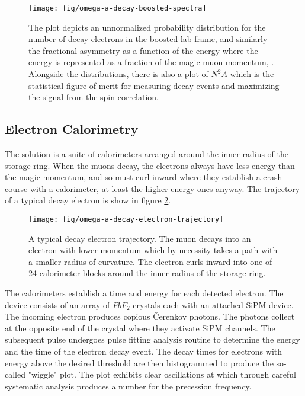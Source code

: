 \begin{figure}
\label{fig:omega-a-decay-boosted-spectra}
\texttt{[image: fig/omega-a-decay-boosted-spectra]}
\caption{The plot depicts an unnormalized probability distribution for the number of decay electrons in the boosted lab frame, and similarly the fractional asymmetry as a function of the energy where the energy is represented as a fraction of the magic muon momentum, \pmagic. Alongside the distributions, there is also a plot of $N^2A$ which is the statistical figure of merit for measuring decay events and maximizing the signal from the spin correlation.}
\end{figure}

\subsection{Electron Calorimetry}

The solution is a suite of calorimeters arranged around the inner radius of the storage ring.  When the muons decay, the electrons always have less energy than the magic momentum, and so must curl inward where they establish a crash course with a calorimeter, at least the higher energy ones anyway. The trajectory of a typical decay electron is show in figure \ref{fig:omega-a-decay-electron-trajectory}.

\begin{figure}
\label{fig:omega-a-decay-electron-trajectory}
\texttt{[image: fig/omega-a-decay-electron-trajectory]}
\caption{A typical decay electron trajectory.  The muon decays into an electron with lower momentum which by necessity takes a path with a smaller radius of curvature.  The electron curls inward into one of 24 calorimeter blocks around the inner radius of the storage ring.}
\end{figure}

The calorimeters establish a time and energy for each detected electron.  The device consists of an array of $PbF_2$ crystals each with an attached SiPM device.  The incoming electron produces copious \v{C}erenkov photons.  The photons collect at the opposite end of the crystal where they activate SiPM channels.  The subsequent pulse undergoes pulse fitting analysis routine to determine the energy and the time of the electron decay event.  The decay times for electrons with energy above the desired threshold are then histogrammed to produce the so-called "wiggle" plot.  The plot exhibits clear oscillations at \wa which through careful systematic analysis produces a number for the precession frequency.


